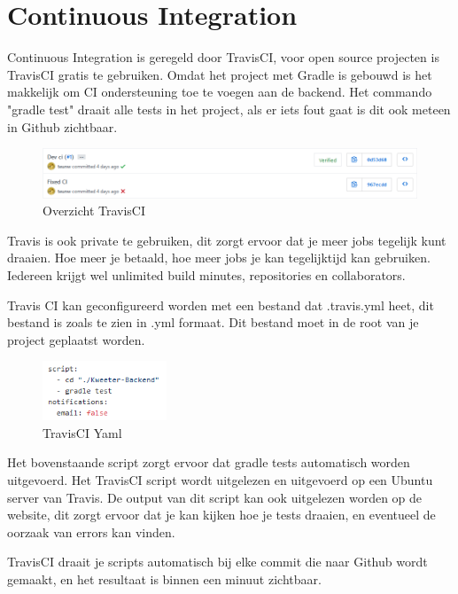 \chapter{Continuous Integration}
Continuous Integration is geregeld door TravisCI, voor open source projecten is TravisCI gratis te gebruiken.
Omdat het project met Gradle is gebouwd is het makkelijk om CI ondersteuning toe te voegen aan de backend.
Het commando "gradle test" draait alle tests in het project, als er iets fout gaat is dit ook meteen in Github zichtbaar.

\begin{figure}[H]
	\includegraphics[width=\textwidth]{images/TravisCi.png}
	\caption{Overzicht TravisCI}
	\label{fig:TravisCI}
\end{figure}
Travis is ook private te gebruiken, dit zorgt ervoor dat je meer jobs tegelijk kunt draaien.
Hoe meer je betaald, hoe meer jobs je kan tegelijktijd kan gebruiken.
Iedereen krijgt wel unlimited build minutes, repositories en collaborators.

Travis CI kan geconfigureerd worden met een bestand dat .travis.yml heet, dit bestand is zoals te zien in .yml formaat.
Dit bestand moet in de root van je project geplaatst worden. 
\begin{figure}[H]
	\centering\includegraphics[width=0.33\textwidth]{images/TravisCIYml}
	\caption{TravisCI Yaml}
\end{figure}

Het bovenstaande script zorgt ervoor dat gradle tests automatisch worden uitgevoerd.
Het TravisCI script wordt uitgelezen en uitgevoerd op een Ubuntu server van Travis.
De output van dit script kan ook uitgelezen worden op de website, dit zorgt ervoor dat je kan kijken hoe je tests draaien, en eventueel de oorzaak van errors kan vinden.

TravisCI draait je scripts automatisch bij elke commit die naar Github wordt gemaakt, en het resultaat is binnen een minuut zichtbaar.